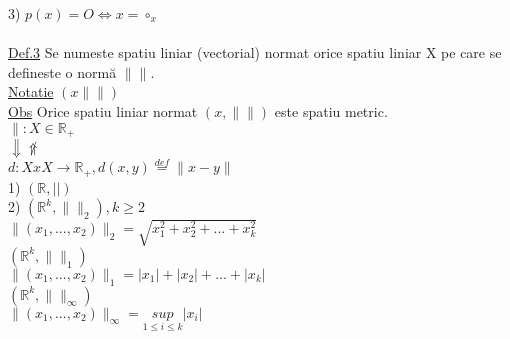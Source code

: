 \documentclass[12pt]{extarticle}
\begin{document}
{		3) $p(x) = O \Leftrightarrow x = \circ_{x}$ \\
		\\
		\underline{Def.3} Se numeste spatiu liniar (vectorial) normat orice spatiu liniar X pe care se defineste o normă $\| \|$.\\
		\underline{Notatie} $(x\| \|)$ \\
		\underline{Obs} Orice spatiu liniar normat $(x, \| \|)$ este spatiu metric. \\
		$\| : X \in \mathbb{R_{+}}$ \\
		$\Downarrow \not\Uparrow$ \\
		$d : XxX \rightarrow \mathbb{R_{+}}, d(x, y) \overset{def}{=} \|x - y\| $ \\
		1) $(\mathbb{R}, | |)$ \\
		2) $(\mathbb{R}^{k}, \| \|_{2} ), k \geq 2$ \\
		$\|(x_{1}, ..., x_{2})\|_{2} = \sqrt{x_{1}^{2} + x_{2}^{2} + ... + x_{k}^{2}}$ \\
		$(\mathbb{R}^{k}, \| \|_{1} )$ \\
		$\|(x_{1}, ..., x_{2})\|_{1} = |x_{1}| + |x_{2}| + ... + |x_{k}|$ \\
		$(\mathbb{R}^{k}, \| \|_{\infty} )$ \\
		$\|(x_{1}, ..., x_{2})\|_{\infty} = \underset{1 \leq i \leq k}{sup}|x_{i}|$ \\
		\\
	}
	
\end{document}
